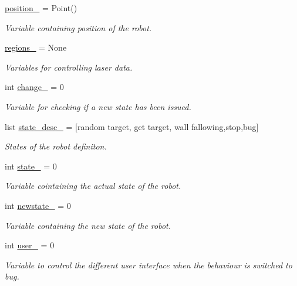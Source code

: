 \begin{DoxyCompactItemize}
\hyperlink{namespacebig__brain_a463bcdb8c7ed9954756492cdce9a43e2}{position\+\_\+} = Point()
\begin{DoxyCompactList}\small\item\em Variable containing position of the robot. \end{DoxyCompactList}\item 
\hyperlink{namespacebig__brain_a5f0f2fbee791fd60caa7a9dcf6ca1e00}{regions\+\_\+} = None
\begin{DoxyCompactList}\small\item\em Variables for controlling laser data. \end{DoxyCompactList}\item 
int \hyperlink{namespacebig__brain_ac43f9e8255d9b336a4f3ebe4dc3d2246}{change\+\_\+} = 0
\begin{DoxyCompactList}\small\item\em Variable for checking if a new state has been issued. \end{DoxyCompactList}\item 
list \hyperlink{namespacebig__brain_ab730e09c9bd7f5c7a1c09a8ea55a9029}{state\+\_\+desc\+\_\+} = \mbox{[}\textquotesingle{}random target\textquotesingle{}, \textquotesingle{}get target\textquotesingle{}, \textquotesingle{}wall fallowing\textquotesingle{},\textquotesingle{}stop\textquotesingle{},\textquotesingle{}bug\textquotesingle{}\mbox{]}
\begin{DoxyCompactList}\small\item\em States of the robot definiton. \end{DoxyCompactList}\item 
int \hyperlink{namespacebig__brain_a95db081b16847592a7981a7205e66358}{state\+\_\+} = 0
\begin{DoxyCompactList}\small\item\em Variable cointaining the actual state of the robot. \end{DoxyCompactList}\item 
int \hyperlink{namespacebig__brain_a28f405a0651539e59bd455a35ab07a3c}{newstate\+\_\+} = 0
\begin{DoxyCompactList}\small\item\em Variable containing the new state of the robot. \end{DoxyCompactList}\item 
int \hyperlink{namespacebig__brain_a82350019fe3047e74222abd0d6b07c14}{user\+\_\+} = 0
\begin{DoxyCompactList}\small\item\em Variable to control the different user interface when the behaviour is switched to bug. \end{DoxyCompactList}\end{DoxyCompactItemize}


